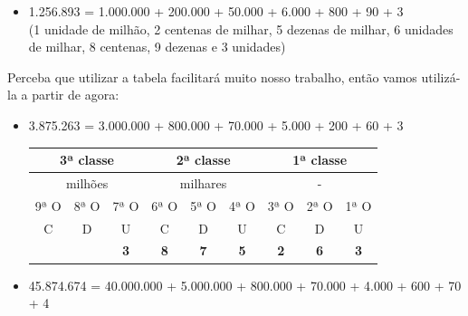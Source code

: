 \begin{itemize}
    \item 1.256.893 = 1.000.000 + 200.000 + 50.000 + 6.000 + 800 + 90 + 3 \\ 
    (1 unidade de milhão, 2 centenas de milhar, 5 dezenas de milhar, 6 unidades de milhar, 8 centenas, 9 dezenas e 3 unidades)
\end{itemize}

Perceba que utilizar a tabela facilitará muito nosso trabalho, então vamos utilizá-la a partir de agora:

\begin{itemize}
    \item 3.875.263 = 3.000.000 + 800.000 + 70.000 + 5.000 + 200 + 60 + 3

\begin{table}[H]
\begin{tabular}{|ccc|ccc|ccc|}
\hline
\multicolumn{3}{|c|}{3ª classe} & \multicolumn{3}{c|}{2ª classe} & \multicolumn{3}{c|}{1ª classe} \\ \hline
\multicolumn{3}{|c|}{milhões} & \multicolumn{3}{c|}{milhares} & \multicolumn{3}{c|}{-} \\ \hline
\multicolumn{1}{|c|}{9ª O} & \multicolumn{1}{c|}{8ª O} & 7ª O & \multicolumn{1}{c|}{6ª O} & \multicolumn{1}{c|}{5ª O} & 4ª O & \multicolumn{1}{c|}{3ª O} & \multicolumn{1}{c|}{2ª O} & 1ª O \\ \hline
\multicolumn{1}{|c|}{C} & \multicolumn{1}{c|}{D} & U & \multicolumn{1}{c|}{C} & \multicolumn{1}{c|}{D} & U & \multicolumn{1}{c|}{C} & \multicolumn{1}{c|}{D} & U \\ \hline
\rowcolor[HTML]{FFFC9E} 
\multicolumn{1}{|c|}{\cellcolor[HTML]{FFFC9E}\textbf{}} & \multicolumn{1}{c|}{\cellcolor[HTML]{FFFC9E}\textbf{}} & \textbf{3} & \multicolumn{1}{c|}{\cellcolor[HTML]{FFFC9E}\textbf{8}} & \multicolumn{1}{c|}{\cellcolor[HTML]{FFFC9E}\textbf{7}} & \textbf{5} & \multicolumn{1}{c|}{\cellcolor[HTML]{FFFC9E}\textbf{2}} & \multicolumn{1}{c|}{\cellcolor[HTML]{FFFC9E}\textbf{6}} & \textbf{3} \\ \hline
\end{tabular}
\end{table}

    \item 45.874.674 = 40.000.000 + 5.000.000 + 800.000 + 70.000 + 4.000 + 600 + 70 + 4


\end{itemize}

